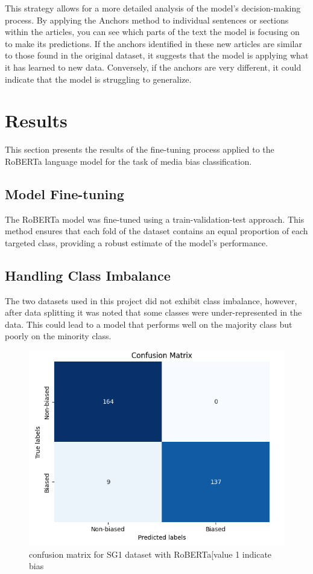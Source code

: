 \documentclass[11pt,a4paper]{article}
\begin{document}
This strategy allows for a more detailed analysis of the model’s decision-making process. By applying the Anchors method to individual sentences or sections within the articles, you can see which parts of the text the model is focusing on to make its predictions.
If the anchors identified in these new articles are similar to those found in the original dataset, it suggests that the model is applying what it has learned to new data. Conversely, if the anchors are very different, it could indicate that the model is struggling to generalize.
\section{Results}
This section presents the results of the fine-tuning process applied to the RoBERTa language model for the task of media bias classification.
\subsection{Model Fine-tuning}
The RoBERTa model was fine-tuned using a train-validation-test approach. This method ensures that each fold of the dataset contains an equal proportion of each targeted class, providing a robust estimate of the model’s performance.
\subsection{Handling Class Imbalance}
The two datasets used in this project did not exhibit class imbalance, however, after data splitting it was noted that some classes were under-represented in the data. This could lead to a model that performs well on the majority class but poorly on the minority class.

\begin{figure}[h]
    \centering
    \includegraphics[width=0.9\linewidth]{cm_SG1_cl.png}
    \caption{confusion matrix for SG1 dataset with RoBERTa[value 1 indicate bias}
    \label{fig:enter-label}
\end{figure}
\end{document}
